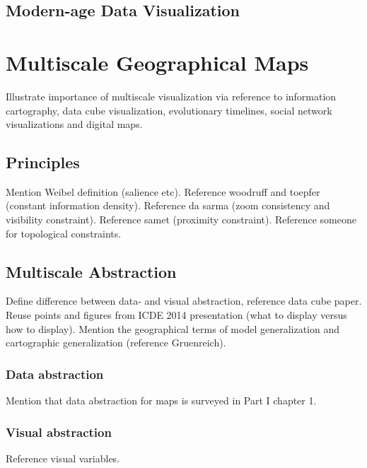 \documentclass[11pt, oneside]{report}   	%
\begin{document}

\section{Modern-age Data Visualization}

\chapter{Multiscale Geographical Maps}
Illustrate importance of multiscale visualization via reference to information cartography, data cube visualization, evolutionary timelines, social network visualizations and digital maps.

\section{Principles}
Mention Weibel definition (salience etc). Reference woodruff and toepfer (constant information density). Reference da sarma (zoom consistency and visibility constraint). Reference samet (proximity constraint). Reference someone for topological constraints.

\section{Multiscale Abstraction}
Define difference between data- and visual abstraction, reference data cube paper. Reuse points and figures from ICDE 2014 presentation (what to display versus how to display). Mention the geographical terms of model generalization and cartographic generalization (reference Gruenreich). 

\subsection{Data abstraction}
Mention that data abstraction for maps is surveyed in Part I chapter 1.

\subsubsection{}

\subsection{Visual abstraction}
Reference visual variables.
\end{document}
